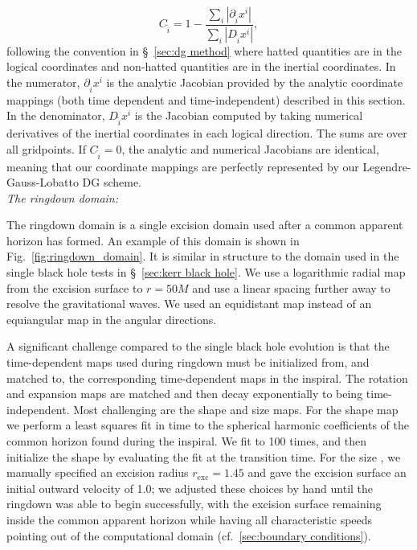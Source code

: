 \begin{bibunit}[unsrtnat]
{\begin{equation}
  C_{\hat{i}} = 1 - \frac{\sum_i |\partial_{\hat{i}} x^i|}
    {\sum_i |D_{\hat{i}} x^i|},
\end{equation}
following the convention in \S~\ref{sec:dg method} where hatted quantities are in
the logical coordinates and non-hatted quantities are in the inertial
coordinates. In the numerator, $\partial_{\hat{i}} x^i$ is the analytic Jacobian
provided by the analytic coordinate mappings (both time dependent and
time-independent) described in this section. In the denominator, $D_{\hat{i}}
x^i$ is the Jacobian computed by taking numerical derivatives of the inertial
coordinates in each logical direction. The sums are over all gridpoints. If
$C_{\hat{i}} = 0$, the analytic and numerical Jacobians are identical, meaning
that our coordinate mappings are perfectly represented by our
Legendre-Gauss-Lobatto DG scheme.
}
\\

\noindent\textit{The ringdown domain:}

The ringdown domain is a single excision domain used after a common apparent
horizon has formed. An example of this domain is shown in
Fig.~\ref{fig:ringdown_domain}. It is similar in structure to the domain used
in the single black hole tests in \S~\ref{sec:kerr black hole}. We use a
logarithmic radial map from the excision surface to $r=50M$ and use a linear
spacing further away to resolve the gravitational waves. We used an equidistant
map instead of an equiangular map in the angular directions.

A significant challenge compared to the single black hole evolution is that the
time-dependent maps used during ringdown must be initialized from, and matched
to, the corresponding time-dependent maps in the inspiral. The rotation and
expansion maps are matched and then decay exponentially to being
time-independent. Most challenging are the shape and size maps. For the shape
map we perform a least squares fit in time to the spherical harmonic
coefficients of the common horizon  found during the
inspiral. We fit to 100 times, and then initialize the shape  by
evaluating the fit at the transition time. For the size , we
manually specified an excision radius $r_{\mathrm{exc}} = 1.45$ and gave the
excision surface an initial outward  velocity of 1.0; we adjusted these
choices by hand until the ringdown was able to begin successfully, with the
excision surface remaining inside the common apparent horizon while having all
characteristic speeds pointing out of the computational domain
(cf.~\ref{sec:boundary conditions}).


\end{bibunit}
